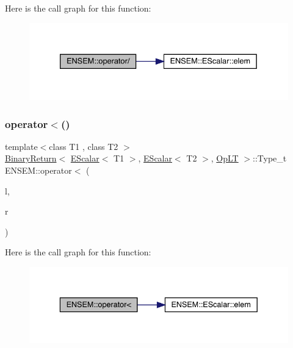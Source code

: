 Here is the call graph for this function\+:
\nopagebreak
\begin{figure}[H]
\begin{center}
\leavevmode
\includegraphics[width=333pt]{d4/dca/group__escalar_ga6afeb39f3b92a8cfc99b5dc1689d0488_cgraph}
\end{center}
\end{figure}
\mbox{\label{group__escalar_gad3a307ef5e78a5c23670ded8c75cdde5}} 
\subsubsection{\texorpdfstring{operator$<$()}{operator<()}}
{\footnotesize\ttfamily template$<$class T1 , class T2 $>$ \\
\mbox{\hyperlink{structENSEM_1_1BinaryReturn}{Binary\+Return}}$<$ \mbox{\hyperlink{classENSEM_1_1EScalar}{E\+Scalar}}$<$ T1 $>$, \mbox{\hyperlink{classENSEM_1_1EScalar}{E\+Scalar}}$<$ T2 $>$, \mbox{\hyperlink{structENSEM_1_1OpLT}{Op\+LT}} $>$\+::Type\+\_\+t E\+N\+S\+E\+M\+::operator$<$ (\begin{DoxyParamCaption}\item[{const \mbox{\hyperlink{classENSEM_1_1EScalar}{E\+Scalar}}$<$ T1 $>$ \&}]{l,  }\item[{const \mbox{\hyperlink{classENSEM_1_1EScalar}{E\+Scalar}}$<$ T2 $>$ \&}]{r }\end{DoxyParamCaption})\hspace{0.3cm}{\ttfamily [inline]}}

Here is the call graph for this function\+:
\nopagebreak
\begin{figure}[H]
\begin{center}
\leavevmode
\includegraphics[width=336pt]{d4/dca/group__escalar_gad3a307ef5e78a5c23670ded8c75cdde5_cgraph}
\end{center}
\end{figure}
\mbox{\label{group__escalar_ga2a24d07560f549aee97bb63ceed9ed50}} 
